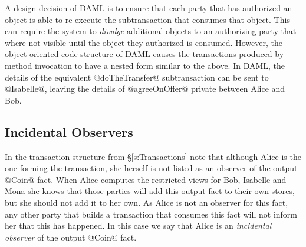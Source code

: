 A design decision of DAML is to ensure that each party that has authorized an object is able to re-execute the subtransaction that consumes that object. This can require the system to \emph{divulge} additional objects to an authorizing party that where not visible until the object they authorized is consumed. However, the object oriented code structure of DAML causes the transactions produced by method invocation to have a nested form similar to the above. In DAML, the details of the equivalent @doTheTransfer@ subtransaction can be sent to @Isabelle@, leaving the details of @agreeOnOffer@ private between Alice and Bob.



\subsection{Incidental Observers}
In the transaction structure from \S\ref{s:Transactions} note that although Alice is the one forming the transaction, she herself is not listed as an observer of the output @Coin@ fact. When Alice computes the restricted views for Bob, Isabelle and Mona she knows that those parties will add this output fact to their own stores, but she should not add it to her own. As Alice is not an observer for this fact, any other party that builds a transaction that consumes this fact will not inform her that this has happened. In this case we say that Alice is an \emph{incidental observer} of the output @Coin@ fact.




